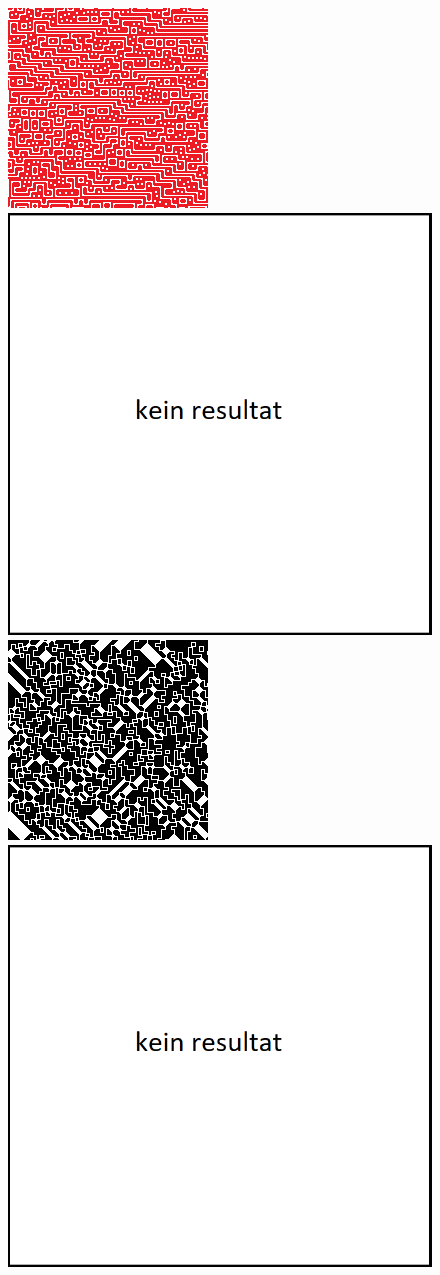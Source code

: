 \documentclass[12pt, a4paper,twoside,openany]{report} %
\begin{document}
\begin{figure}[H]
    \centering
    \includegraphics[width=0.45\linewidth]{images/wfc-model-comparison/red-dot-model.png}%
    \qquad
    \includegraphics[width=0.45\linewidth]{images/wfc-model-comparison/kein-resultat.png}%
    \vspace{1em}
    \includegraphics[width=0.45\linewidth]{images/wfc-model-comparison/shrew-model.png}%
    \qquad
    \includegraphics[width=0.45\linewidth]{images/wfc-model-comparison/kein-resultat.png}%

\end{figure}
\end{document}
